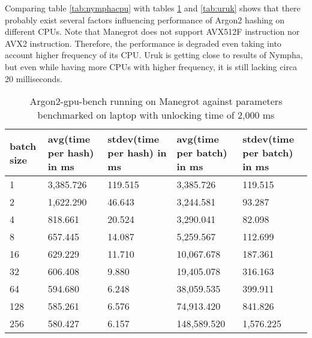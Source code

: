 \documentclass[nolof,digital]{fithesis3}
\begin{document}
\FloatBarrier

Comparing table \ref{tab:nymphacpu} with tables \ref{tab:manegrot} and \ref{tab:uruk} shows that there probably exist several factors influencing performance of Argon2 hashing on different CPUs. Note that Manegrot does not support AVX512F instruction nor AVX2 instruction. Therefore, the performance is degraded even taking into account higher frequency of its CPU. Uruk is getting close to results of Nympha, but even while having more CPUs with higher frequency, it is still lacking circa 20 milliseconds.

\FloatBarrier

\noindent
\begin{table}
\caption{Argon2-gpu-bench running on Manegrot against parameters benchmarked on laptop with unlocking time of 2,000 ms}
\label{tab:manegrot}
\begin{tabularx}{\textwidth}{| X | X | X | X | X |}
\hline
batch size & avg(time per hash) in ms & stdev(time per hash) in ms & avg(time per batch) in ms & stdev(time per batch) in ms\\
\hline
1 & 3,385.726 & 119.515 & 3,385.726 & 119.515\\
\hline
2 & 1,622.290 & 46.643 & 3,244.581 & 93.287\\
\hline
4 & 818.661 & 20.524 & 3,290.041 & 82.098\\
\hline
8 & 657.445 & 14.087 & 5,259.567 & 112.699\\
\hline
16 & 629.229 & 11.710 & 10,067.678 & 187.361\\
\hline
32 & 606.408 & 9.880 & 19,405.078 & 316.163\\
\hline
64 & 594.680 & 6.248 & 38,059.535 & 399.911\\
\hline
128 & 585.261 & 6.576 & 74,913.420 & 841.826\\
\hline
256 & 580.427 & 6.157 & 148,589.520 & 1,576.225\\
\hline
\end{tabularx}
\end{table}
\end{document}
